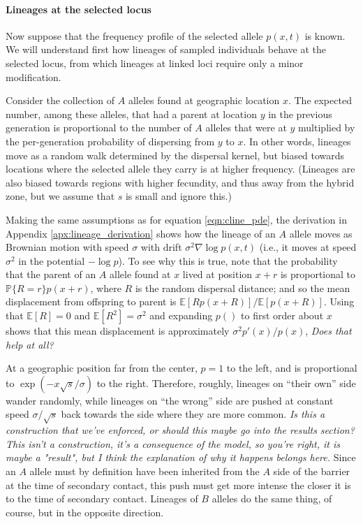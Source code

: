 \documentclass[11pt,letterpaper]{article}
\newcommand{\alisa}[1]{{\em \color{red} #1}}
\newcommand{\plr}[1]{{\em \color{blue} #1}}
\newcommand{\E}{\mathbb{E}}
\renewcommand{\P}{\mathbb{P}}
\newcommand{\grad}{\nabla}
\begin{document}
\paragraph{Lineages at the selected locus}
Now suppose that the frequency profile of the selected allele $p(x,t)$ is known.
We will understand first how lineages of sampled individuals behave at the selected locus,
from which lineages at linked loci require only a minor modification.

Consider the collection of $A$ alleles found at geographic location $x$.
The expected number, among these alleles, that had a parent at location $y$ in the previous generation 
is proportional to the number of $A$ alleles that were at $y$ multiplied by the per-generation probability of dispersing from $y$ to $x$. 
In other words, lineages move as a random walk determined by the dispersal kernel,
but biased towards locations where the selected allele they carry is at higher frequency.
(Lineages are also biased towards regions with higher fecundity,
and thus away from the hybrid zone, but we assume that $s$ is small and ignore this.)

Making the same assumptions as for equation \eqref{eqn:cline_pde}, the derivation in Appendix \ref{apx:lineage_derivation} shows 
how the lineage of an $A$ allele moves as Brownian motion with speed $\sigma$
with drift $\sigma^2 \grad \log p(x,t)$ (i.e., it moves at speed $\sigma^2$ in the potential $-\log p$).
To see why this is true, note that the probability that the parent of an $A$ allele found at $x$
lived at position $x+r$ is proportional to $\P\{R=r\} p(x+r)$, where $R$ is the random dispersal distance;
and so the mean displacement from offspring to parent is $\E[R p(x+R)]/\E[p(x+R)]$.
Using that $\E[R]=0$ and $\E[R^2]=\sigma^2$
and expanding $p()$ to first order about $x$ shows that this mean displacement is approximately $\sigma^2 p'(x)/p(x)$,
\plr{Does that help at all?}

At a geographic position far from the center, $p=1$ to the left, and is proportional to  $\exp(-x\sqrt{s}/\sigma)$ to the right.
Therefore, roughly, lineages on ``their own'' side wander randomly,
while lineages on ``the wrong'' side are pushed at constant speed $\sigma/\sqrt{s}$ 
back towards the side where they are more common. 
\alisa{Is this a construction that we've enforced, or should this maybe go into the results section?}
\plr{This isn't a construction, it's a consequence of the model, so you're right, it is maybe a "result", but I think the explanation of why it happens belongs here.}
Since an $A$ allele must by definition have been inherited from the $A$ side of the barrier 
at the time of secondary contact, this push must get more intense the closer it is to the time of secondary contact.
Lineages of $B$ alleles do the same thing, of course, but in the opposite direction. 
\end{document}
